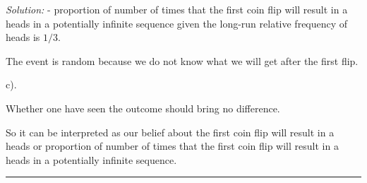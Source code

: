 \documentclass[a4paper, 11pt]{article}
\newenvironment{solution}
    {\textit{Solution:}}
    {}
\begin{document}
\begin{solution}
- proportion of number of times that the first coin flip will result in a heads in a potentially infinite sequence given the long-run relative frequency of heads is $1/3$.

The event is random because we do not know what we will get after the first flip.

c).

Whether one have seen the outcome should bring no difference.

So it can be interpreted as our belief about the first coin flip will result in a heads or proportion of number of times that the first coin flip will result in a heads in a potentially infinite sequence.


\end{solution} 
\noindent\rule{7in}{2.8pt}
\end{document}
